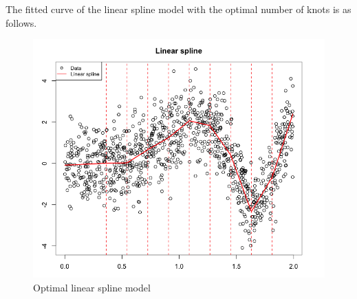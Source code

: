 \documentclass[12pt]{article}
\begin{document}
The fitted curve of the linear spline model with the optimal number of knots is as follows.
\begin{figure}
\begin{center}
\caption{Optimal linear spline model}
\includegraphics[scale=0.50]{linear spline}
\end{center}
\end{figure}
\end{document}

